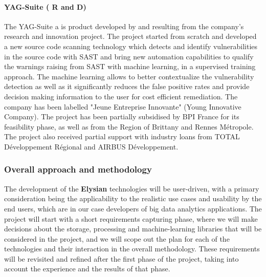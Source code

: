 \documentclass[a4paper,11pt]{article}
\newcommand{\project}[1]{\textbf{#1}\xspace}
\newcommand{\SECURITY}{\project{Elysian}}
\newcommand{\TheProject}{\SECURITY}
\begin{document}
\begin{mdframed}[backgroundcolor=blue!5]
\paragraph{YAG-Suite (\YAGshort{} R and D) } The YAG-Suite a is product developed by \YAGshort{} and resulting from the company's research and innovation project. The project started from scratch and developed a new source code scanning technology which detects and identify vulnerabilities in the source code with SAST and bring new automation capabilities to qualify the warnings raising from SAST with machine learning, in a supervised training approach. The machine learning allows to better contextualize the vulnerability detection as well as it significantly reduces the false positive rates and provide decision making information to the user for cost efficient remediation.    
The company has been labelled "Jeune Entreprise Innovante" (Young Innovative Company). The project has been partially subsidised by BPI France for its feasibility phase, as well as from the Region of Brittany and Rennes Métropole. The project also received partial support with industry loans from TOTAL Développement Régional and AIRBUS Développement. 
\end{mdframed}

\subsubsection{Overall approach and methodology}


The development of the \TheProject{} technologies will be user-driven, with a primary consideration being the applicability to the realistic use cases and usability by the end users, which are in our case developers of big data analytics applications. The project will start with a short requirements capturing phase, where we will make decisions about the storage, processing and machine-learning libraries that will be considered in the project, and we will scope out the plan for each of the technologies and their interaction in the overall methodology. These requirements will be revisited and refined after the first phase of the project, taking into account the experience and the results of that phase.
\end{document}
